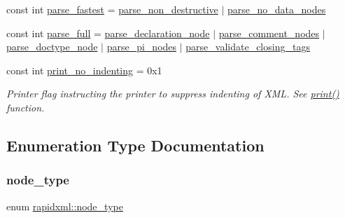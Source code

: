 \begin{DoxyCompactItemize}
\item 
const int \mbox{\hyperlink{namespacerapidxml_a64da06dfdab7c86ca954bda4fecb978f}{parse\+\_\+fastest}} = \mbox{\hyperlink{namespacerapidxml_a45d4d8fef551beaaba23a83b847fd6a3}{parse\+\_\+non\+\_\+destructive}} $\vert$ \mbox{\hyperlink{namespacerapidxml_ac2d21ef14a4e8936b94aca5d38b1a74d}{parse\+\_\+no\+\_\+data\+\_\+nodes}}
\item 
const int \mbox{\hyperlink{namespacerapidxml_abb48dc65db75d9e49734bc5bd2fabbfc}{parse\+\_\+full}} = \mbox{\hyperlink{namespacerapidxml_a999d782659513f8015ea4236e3204c42}{parse\+\_\+declaration\+\_\+node}} $\vert$ \mbox{\hyperlink{namespacerapidxml_ae093dd49e2f59fa39eee95f1a6568e32}{parse\+\_\+comment\+\_\+nodes}} $\vert$ \mbox{\hyperlink{namespacerapidxml_a41002b49780a90a0bbcc28ce8b895fe4}{parse\+\_\+doctype\+\_\+node}} $\vert$ \mbox{\hyperlink{namespacerapidxml_a03fe68fcf5d28f38476e0fd31adecc4c}{parse\+\_\+pi\+\_\+nodes}} $\vert$ \mbox{\hyperlink{namespacerapidxml_a7ce8f40fda68338e20b56f41e48e49f3}{parse\+\_\+validate\+\_\+closing\+\_\+tags}}
\item 
const int \mbox{\hyperlink{namespacerapidxml_a65477b812a80f5bda693ec57e57de064}{print\+\_\+no\+\_\+indenting}} = 0x1
\begin{DoxyCompactList}\small\item\em Printer flag instructing the printer to suppress indenting of X\+ML. See \mbox{\hyperlink{namespacerapidxml_a0fb0be6eba49fb2e2646d5a72a0dc355}{print()}} function. \end{DoxyCompactList}\end{DoxyCompactItemize}


\subsection{Enumeration Type Documentation}
\mbox{\label{namespacerapidxml_abb456db38f7efb746c4330eed6072a7c}} 
\subsubsection{\texorpdfstring{node\+\_\+type}{node\_type}\hspace{0.1cm}{\footnotesize\ttfamily [1/2]}}
{\footnotesize\ttfamily enum \mbox{\hyperlink{namespacerapidxml_abb456db38f7efb746c4330eed6072a7c}{rapidxml\+::node\+\_\+type}}}

